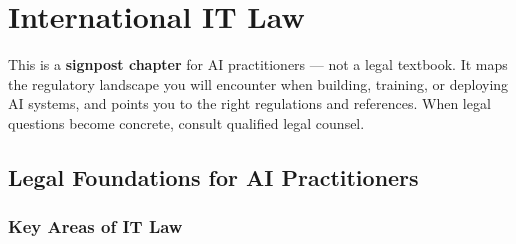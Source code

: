 \chapter{International IT Law}

\begin{tcolorbox}[skin=sectionboxskin, title=Chapter Scope]
    This is a \textbf{signpost chapter} for AI practitioners — not a legal textbook.
    It maps the regulatory landscape you will encounter when building, training, or deploying AI systems,
    and points you to the right regulations and references.
    When legal questions become concrete, consult qualified legal counsel.
\end{tcolorbox}

\section{Legal Foundations for AI Practitioners}

\subsection{Key Areas of IT Law}

